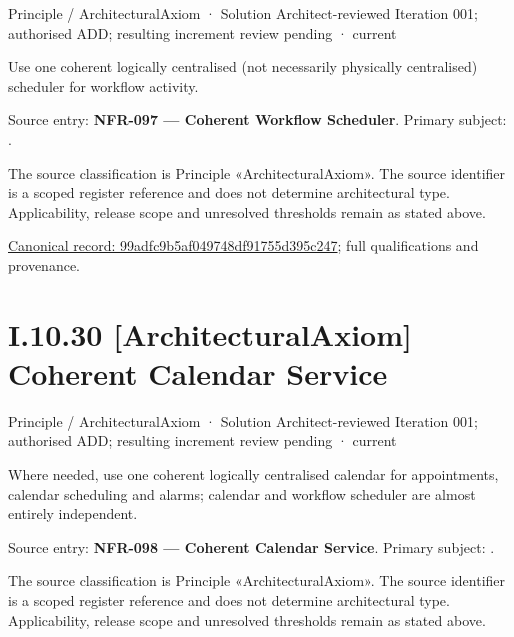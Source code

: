 \label{element:99adfc9b5af049748df91755d395c247}
{\small Principle / ArchitecturalAxiom · Solution Architect-reviewed Iteration 001; authorised ADD; resulting increment review pending · current}\par

Use one coherent logically centralised (not necessarily physically centralised) scheduler for workflow activity.



Source entry: \textbf{NFR-097 — Coherent Workflow Scheduler}. Primary subject: \texttt{}.



The source classification is Principle «ArchitecturalAxiom». The source identifier is a scoped register reference and does not determine architectural type. Applicability, release scope and unresolved thresholds remain as stated above.


{\footnotesize \href{../../../../../../../../continuum/motivation/principle/architectural-axiom/99adfc9b5af049748df91755d395c247.md}{Canonical record: 99adfc9b5af049748df91755d395c247}; full qualifications and provenance.}\par
\section*{I.10.30 [ArchitecturalAxiom] Coherent Calendar Service}
\label{navigation:I.10.30}

\label{element:a9b1d031fa844057aa030f09e4fa6b01}
{\small Principle / ArchitecturalAxiom · Solution Architect-reviewed Iteration 001; authorised ADD; resulting increment review pending · current}\par

Where needed, use one coherent logically centralised calendar for appointments, calendar scheduling and alarms; calendar and workflow scheduler are almost entirely independent.



Source entry: \textbf{NFR-098 — Coherent Calendar Service}. Primary subject: \texttt{}.



The source classification is Principle «ArchitecturalAxiom». The source identifier is a scoped register reference and does not determine architectural type. Applicability, release scope and unresolved thresholds remain as stated above.



